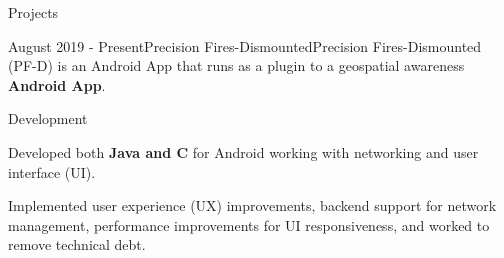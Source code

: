 \documentclass{article}
\newlength{\tabin}
\newlength{\secsep}
\newcommand{\lineunder}{\vspace*{-8pt} \\ \hspace*{-6pt} \hrulefill \\ \vspace*{-15pt}}
\newenvironment{tabbedsection}[1]{
	\begin{list}{}{
			\setlength{\itemsep}{0pt}
			\setlength{\labelsep}{0pt}
			\setlength{\labelwidth}{0pt}
			\setlength{\leftmargin}{0pt}
			\setlength{\rightmargin}{\tabin}
			\setlength{\listparindent}{0pt}
			\setlength{\parsep}{0pt}
			\setlength{\parskip}{0pt}
			\setlength{\partopsep}{0pt}
			\setlength{\topsep}{#1}
		}
		\item[]
	}{\end{list}}
\newenvironment{resume_section}[1]{
	\filbreak
	\vspace{2\secsep}
	\textsc{\color{blue}\large#1}
	\lineunder
	\begin{tabbedsection}{\secsep}
	}{\end{tabbedsection}}
\newenvironment{resume_subsection}[2]{
	\textbf{\color{BlueViolet}#2} \hfill {\normalsize (#1)} \hspace{-5em}
	\begin{tabbedsection}{0.5\secsep}
		\begin{subitems}
		}{\end{subitems}\end{tabbedsection}}
\newenvironment{resume_project_subsection}[3]{
	\textbf{\color{BlueViolet}#2} \hfill \hspace{-5em} {\normalsize (#1)}
	\\ {\small \textit{ #3}}
	\begin{tabbedsection}{0.5\secsep}
		\begin{subitems}
		}{\end{subitems}\end{tabbedsection}}
\newenvironment{subitems}{
	\renewcommand{\labelitemi}{-}
	\begin{itemize}
		\setlength{\labelsep}{1em}
	}{\end{itemize}}
\newenvironment{resume_skill_group}[1]{
	\hspace{-18pt}\textbf{#1}
	\begin{itemize}
	}{\end{itemize}}
\begin{document}
\begin{resume_section}{Projects}
\begin{resume_project_subsection}{August 2019 - Present}{Precision Fires-Dismounted}{Precision Fires-Dismounted (PF-D) is an Android App that runs as a plugin to a geospatial awareness \textbf{Android App}.}
\begin{resume_skill_group}{Development}
					\item
					Developed both \textbf{Java and C} for Android working with networking and user interface (UI).
					\item
					Implemented user experience (UX) improvements, backend support for network
					management, performance improvements for UI responsiveness, and worked to remove technical debt. 
					\iffalse
					\item 
					Implemented basic geographical calculations. 
					\item 
					Initiated the development of a code generation tool to implement a standard message specification. 
					\fi
				\end{resume_skill_group}
		\end{resume_project_subsection}
		\vspace{2\secsep}
		
		\iffalse
		\begin{resume_project_subsection}{June 2019 - September 2019}{Radio Timing Tool}{This application is currently in use to establish the modem timing configurations used to create field networks for tactical digital communications.}
				\item 
					Worked to create a command line interface and assisted in debugging the capturing of timing parameters for \textbf{Python} application.
		\end{resume_project_subsection}
		\vspace{2\secsep}
		\fi
		
		\iffalse
		\begin{resume_subsection}{August 2017 - May 2019}{University Robotics Competition Team}
			\begin{itemize}
				\item 
					As a member of multiple sub teams, using C++ programmed kinematics for Rover’s waypoint navigation, calculated distance of
					objects to Rover given Computer Vision data.
				\item 
					Lead the communications and user interface team.
			\end{itemize}
		\end{resume_subsection}
		\vspace{2\secsep}
		\begin{resume_subsection}{Fall 2018}{Mobile Robotics Project}
			Programmed in C++ to implemented GPS navigation, path planning, and tennis ball (object) detection for autonomous traversal task.
			Using the random error from GPS measurements, created a random searching method. Interfacing programs and data with Robotic
			Operating System. Created simple reactive obstacle avoidance and a waypoint navigation inspired by bug algorithm.
		\end{resume_subsection}
		\fi
	\end{resume_section}
	
\end{document}

